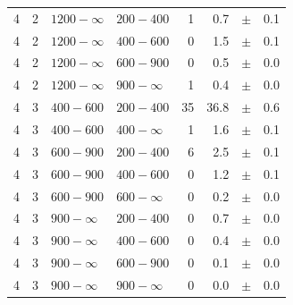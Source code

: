 \begin{table}[!h]
\begin{tabular}{rrllrrcl}
4\T & 2 & $1200- \infty$ & $200-400$ &      1 &      0.7 &$\pm$&    0.1 \\
4 & 2 & $1200- \infty$ & $400-600$ &      0 &      1.5 &$\pm$&    0.1 \\
4 & 2 & $1200- \infty$ & $600-900$ &      0 &      0.5 &$\pm$&    0.0 \\
4 & 2 & $1200- \infty$ & $900-\infty$ &      1 &      0.4 &$\pm$&    0.0 \\
4\T & 3 & $ 400- 600$ & $200-400$ &     35 &     36.8 &$\pm$&    0.6 \\
4 & 3 & $ 400- 600$ & $400-\infty$ &      1 &      1.6 &$\pm$&    0.1 \\
4\T & 3 & $ 600- 900$ & $200-400$ &      6 &      2.5 &$\pm$&    0.1 \\
4 & 3 & $ 600- 900$ & $400-600$ &      0 &      1.2 &$\pm$&    0.1 \\
4 & 3 & $ 600- 900$ & $600-\infty$ &      0 &      0.2 &$\pm$&    0.0 \\
4\T & 3 & $ 900- \infty$ & $200-400$ &      0 &      0.7 &$\pm$&    0.0 \\
4 & 3 & $ 900- \infty$ & $400-600$ &      0 &      0.4 &$\pm$&    0.0 \\
4 & 3 & $ 900- \infty$ & $600-900$ &      0 &      0.1 &$\pm$&    0.0 \\
4 & 3 & $ 900- \infty$ & $900-\infty$ &      0 &      0.0 &$\pm$&    0.0 \\
    \hline
  \end{tabular}
\end{table}


